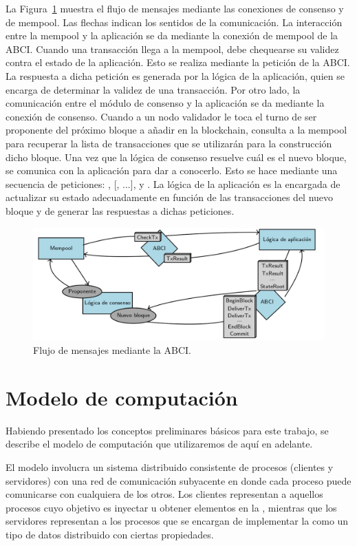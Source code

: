 La Figura~\ref{fig:abci_flow} muestra el flujo de mensajes mediante las conexiones de consenso y de mempool.
%
Las flechas indican los sentidos de la comunicación.
%
La interacción entre la mempool y la aplicación se da mediante la conexión de mempool de la ABCI.
%
Cuando una transacción llega a la mempool, debe chequearse su validez contra el estado de la aplicación.
%
Esto se realiza mediante la petición \CheckTx de la ABCI.
%
La respuesta a dicha petición es generada por la lógica de la aplicación, quien se encarga de determinar la
validez de una transacción.
%
Por otro lado, la comunicación entre el módulo de consenso y la aplicación se da mediante la conexión de consenso.
%
Cuando a un nodo validador le toca el turno de ser proponente del próximo bloque a añadir en la blockchain,
consulta a la mempool para recuperar la lista de transacciones que se utilizarán para la construcción dicho bloque.
%
Una vez que la lógica de consenso resuelve cuál es el nuevo bloque, se comunica con la aplicación para
dar a conocerlo.
%
Esto se hace mediante una secuencia de peticiones: \BeginBlock, [\DeliverTx, ...], \EndBlock y \Commit.
%
La lógica de la aplicación es la encargada de actualizar su estado adecuadamente en función de las transacciones del
nuevo bloque y de generar las respuestas a dichas peticiones.


\begin{figure}
  \centering
  \includegraphics[scale=0.35]{figures/abci_msg_flow.png}
  \caption{Flujo de mensajes mediante la ABCI.}
  \label{fig:abci_flow}
\end{figure}

\section{Modelo de computación}
Habiendo presentado los conceptos preliminares básicos para este trabajo, se describe
el modelo de computación que utilizaremos de aquí en adelante.

El modelo involucra un sistema distribuido consistente de procesos (clientes y servidores) con una
red de comunicación subyacente en donde cada proceso puede comunicarse con cualquiera de los otros.
Los clientes representan a aquellos procesos cuyo objetivo es inyectar u obtener elementos en la \setchain,
mientras que los servidores representan a los procesos que se encargan de implementar la \setchain
como un tipo de datos distribuido con ciertas propiedades.

